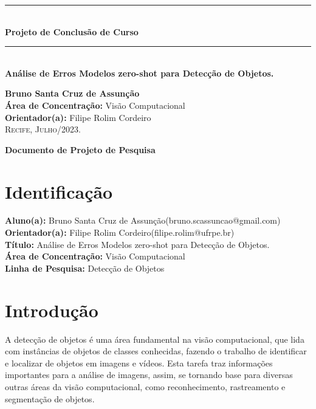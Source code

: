 \documentclass[openany, a4paper,12pt, oneside]{article}
\makeatletter
\def\myname{Bruno Santa Cruz de Assun\c{c}\~{a}o}
\def\myemail{bruno.scassuncao@gmail.com}
\def\mytitle{An\'{a}lise de Erros Modelos zero-shot para Detec\c{c}\~{a}o de Objetos.}
\def\myadvisor{Filipe Rolim Cordeiro}
\def\myadvisoremail{filipe.rolim@ufrpe.br}
\def\concentrationarea{Visão Computacional}
\def\researchline{Detec\c{c}\~{a}o de Objetos}
\makeatother
\begin{document}
\pagestyle{empty}
\begin{flushright}
  \noindent\rule{15cm}{0.4pt}\\[0.5cm]
  \textbf{{ \LARGE Projeto de Conclus\~{a}o de Curso}}\\[0.1cm]
  \noindent\rule{15cm}{0.4pt}\\[7cm]
  \textbf{\Large \mytitle}\\[4cm]
\end{flushright}

\begin{center}
  \textbf{\large \myname }\\[3cm]

  \textbf{\large \'{A}rea de Concentra\c{c}\~{a}o:} \concentrationarea\\
  \textbf{\large Orientador(a):} \myadvisor\\[2cm]
  \vfill
  \textsc{Recife, Julho/2023}.
\end{center}
\pagebreak
{}

\begin{center}
  \textbf{\large Documento de Projeto de Pesquisa}\\[1cm]
\end{center}
\section{Identifica\c{c}\~{a}o}

\textbf{Aluno(a):} \myname (\myemail)\\
\textbf{Orientador(a):} \myadvisor (\myadvisoremail)\\
\textbf{T\'{i}tulo:} \mytitle\\
\textbf{\'{A}rea de Concentra\c{c}\~{a}o:} \concentrationarea\\
\textbf{Linha de Pesquisa:} \researchline\\


\section{Introdu\c{c}\~{a}o}


A detec\c{c}\~{a}o de objetos é uma área fundamental na visão computacional, que lida com inst\^{a}ncias de objetos de classes conhecidas, fazendo o trabalho de identificar e localizar de objetos em imagens e vídeos\cite{Amit2021}. Esta tarefa traz informa\c{c}\~{o}es importantes para a an\'{a}lise de imagens, assim, se tornando base para diversas outras \'{a}reas da vis\~{a}o computacional, como reconhecimento, rastreamento e segmenta\c{c}\~{a}o de objetos\cite{10028728}.
\end{document}
